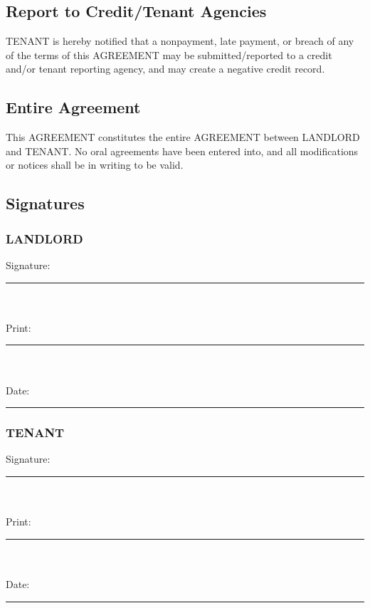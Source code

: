 \documentclass[11pt]{article}
\begin{document}
\subsection*{Report to Credit/Tenant Agencies}
\label{sec:org7c3bf4d}
TENANT is hereby notified that a nonpayment, late payment, or breach
of any of the terms of this AGREEMENT may be submitted/reported to a
credit and/or tenant reporting agency, and may create a negative
credit record.

\subsection*{Entire Agreement}
\label{sec:org05bf1ef}
This AGREEMENT constitutes the entire AGREEMENT between LANDLORD and
TENANT.  No oral agreements have been entered into, and all
modifications or notices shall be in writing to be valid.
\subsection*{Signatures}
\label{sec:org38412ba}
\subsubsection*{LANDLORD}
\label{sec:org6c6efe8}
Signature: \rule{8cm}{0.5pt}
\\  \\  
Print: \rule{8cm}{0.5pt}
\\  \\  
Date: \rule{8cm}{0.5pt}
\subsubsection*{TENANT}
\label{sec:org946e538}
Signature: \rule{8cm}{0.5pt}
\\  \\  
Print: \rule{8cm}{0.5pt}
\\  \\  
Date: \rule{8cm}{0.5pt}
\end{document}
